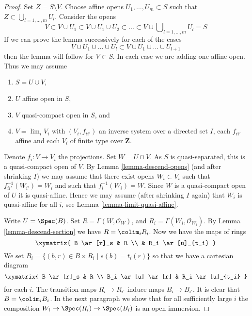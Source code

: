 \begin{proof}
Set $Z = S \setminus V$. Choose affine opens $U_1, \ldots, U_m \subset S$
such that $Z \subset \bigcup_{l = 1, \ldots, m} U_l$. Consider the opens
$$
V \subset V \cup U_1 \subset V \cup U_1 \cup U_2 \subset
\ldots \subset V \cup \bigcup\nolimits_{l = 1, \ldots, m} U_l = S
$$
If we can prove the lemma successively for each of the cases
$$
V \cup U_1 \cup \ldots \cup U_l
\subset
V \cup U_1 \cup \ldots \cup U_{l + 1}
$$
then the lemma will follow for $V \subset S$. In each case we are adding
one affine open. Thus we may assume
\begin{enumerate}
\item $S = U \cup V$,
\item $U$ affine open in $S$,
\item $V$ quasi-compact open in $S$, and
\item $V = \lim_i V_i$ with $(V_i, f_{ii'})$
an inverse system over a directed set $I$, each $f_{ii'}$
affine and each $V_i$ of finite type over $\mathbf{Z}$.
\end{enumerate}
Denote $f_i : V \to V_i$ the projections.
Set $W = U \cap V$. As $S$ is quasi-separated, this is a quasi-compact open
of $V$. By Lemma \ref{lemma-descend-opens}
(and after shrinking $I$) we may assume that there exist
opens $W_i \subset V_i$ such that $f_{ii'}^{-1}(W_{i'}) = W_i$
and such that $f_i^{-1}(W_i) = W$. Since $W$ is a quasi-compact open
of $U$ it is quasi-affine. Hence we may assume (after shrinking $I$ again)
that $W_i$ is quasi-affine for all $i$, see
Lemma \ref{lemma-limit-quasi-affine}.

\medskip\noindent
Write $U = \Spec(B)$. Set $R = \Gamma(W, \mathcal{O}_W)$,
and $R_i = \Gamma(W_i, \mathcal{O}_{W_i})$.
By Lemma \ref{lemma-descend-section} we have $R = \colim_i R_i$.
Now we have the maps of rings
$$
\xymatrix{
B \ar[r]_s & R \\
& R_i \ar[u]_{t_i}
}
$$
We set $B_i = \{(b, r) \in B \times R_i \mid s(b) = t_i(r)\}$ so that we
have a cartesian diagram
$$
\xymatrix{
B \ar[r]_s & R \\
B_i \ar[u] \ar[r] & R_i \ar[u]_{t_i}
}
$$
for each $i$. The transition maps $R_i \to R_{i'}$ induce maps
$B_i \to B_{i'}$. It is clear that $B = \colim_i B_i$.
In the next paragraph we show that for all sufficiently large $i$
the composition $W_i \to \Spec(R_i) \to \Spec(B_i)$ is an open immersion.


\end{proof}
